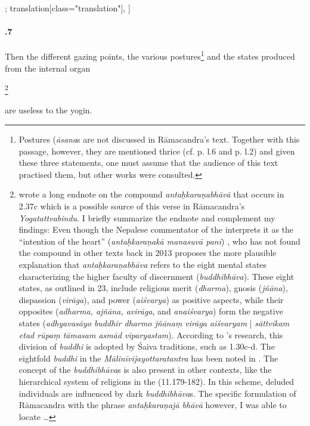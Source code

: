 \begin{alignment}[
  texts=edition[class="edition"];
  translation[class="translation"],
  ]
\begin{translation}
\begin{tlate}[58_7]
      \paragraph{.7} Then the different gazing points, the various postures\footnote{Postures (\textit{āsana}s are not discussed in Rāmacandra's text. Together with this passage, however, they are mentioned thrice (cf. p.\pageref{ashtanga} l.6 and p.\pageref{majesty} l.2) and given these three statements, one must assume that the audience of this text practised them, but other works were consulted.} and the states produced from the internal organ\begin{buber}[f58_1]\footnote{\citeauthor[2013:368, fn. 52]{birch2013} wrote a long endnote on the compound \textit{antaḥkaraṇabhāvā} that occurs in  2.37c which is a possible source of this verse in Rāmacandra's \textit{Yogatattvabindu}. I briefly summarize the endnote and complement my findings: Even though the Nepalese commentator of the  interprets it as the ``intention of the heart'' (\textit{antaḥkaraṇakā manasuvā pani}) \citeauthor{birch2013}, who has not found the compound in other texts back in 2013 proposes the more plausible explanation that \textit{antaḥkaraṇabhāva} refers to the eight mental states characterizing the higher faculty of discernment (\textit{buddhibhāva}). These eight states, as outlined in  23, include religious merit (\textit{dharma}), gnosis (\textit{jñāna}), dispassion (\textit{virāga}), and power (\textit{aiśvarya}) as positive aspects, while their opposites (\textit{adharma, ajñāna, avirāga}, and \textit{anaiśvarya}) form the negative states (\textit{adhyavasāyo buddhir dharmo jñānaṃ virāga aiśvaryam} | \textit{sāttvikam etad rūpaṃ tāmasam asmād viparyastam}). According to \citeauthor{birch2013}'s research, this division of \textit{buddhi} is adopted by Śaiva traditions, such as  1.30c-d. The eightfold \textit{buddhi} in the \textit{Mālinīvijayottaratantra} has been noted in \citeauthor[2004:353, fn. 8]{vasudeva2004}. The concept of the \textit{buddhibhāva}s is also present in other contexts, like the hierarchical system of religions in the  (11.179-182). In this scheme, deluded individuals are influenced by dark \textit{buddhibhāva}s. The specific formulation of Rāmacandra with the phrase \textit{antaḥkaraṇajā bhāvā} however, I was able to locate \ldots}\end{buber} are useless to the yogin.
    \end{tlate}
    \begin{tlate}[58_8]

\end{tlate}
\end{translation}
\end{alignment}
